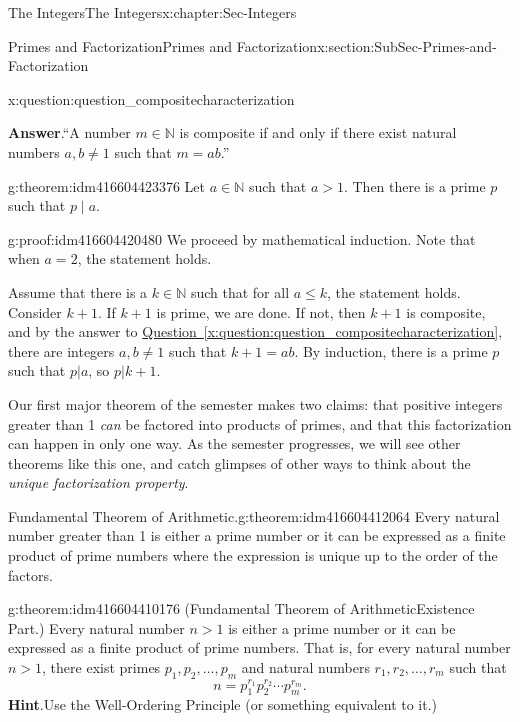 \documentclass[oneside,10pt,]{book}
\numberwithin{equation}{section}
\renewcommand{\le}{\leqslant}
\def\N{{\mathbb N}}
\begin{document}
\begin{chapterptx}{The Integers}{}{The Integers}{}{}{x:chapter:Sec-Integers}
\begin{sectionptx}{Primes and Factorization}{}{Primes and Factorization}{}{}{x:section:SubSec-Primes-and-Factorization}
\begin{question}{}{x:question:question_compositecharacterization}
\par\smallskip%
\noindent\textbf{Answer}.\hypertarget{g:answer:idm416604426080}{}\quad{}``A number \(m\in\N\) is composite if and only if there exist natural numbers \(a,b\ne 1\) such that \(m = ab\).''%
\end{question}
\begin{theorem}{}{}{g:theorem:idm416604423376}%
Let \(a\in \N\) such that \(a > 1\). Then there is a prime \(p\) such that \(p\mid a\).%
\end{theorem}
\begin{proofptx}{}{g:proof:idm416604420480}
We proceed by mathematical induction. Note that when \(a = 2\), the statement holds.%
\par
Assume that there is a \(k\in\N\) such that for all \(a\le k\), the statement holds. Consider \(k+1\). If \(k+1\) is prime, we are done. If not, then \(k+1\) is composite, and by the answer to \hyperref[x:question:question_compositecharacterization]{Question~\ref{x:question:question_compositecharacterization}}, there are integers \(a,b\ne 1\) such that \(k+1 = ab\). By induction, there is a prime \(p\) such that \(p|a\), so \(p|k+1\).%
\end{proofptx}
Our first major theorem of the semester makes two claims: that positive integers greater than 1 \emph{can} be factored into products of primes, and that this factorization can happen in only one way. As the semester progresses, we will see other theorems like this one, and catch glimpses of other ways to think about the \emph{unique factorization property}.%
\begin{theorem}{Fundamental Theorem of Arithmetic.}{}{g:theorem:idm416604412064}%
Every natural number greater than 1 is either a prime number or it can be expressed as a finite product of prime numbers where the expression is unique up to the order of the factors.%
\end{theorem}
\begin{theorem}{}{}{g:theorem:idm416604410176}%
(Fundamental Theorem of Arithmetic\textendash{}Existence Part.)\footnotemark{} Every natural number \(n > 1\) is either a prime number or it can be expressed as a finite product of prime numbers. That is, for every natural number \(n > 1\), there exist primes \(p_1, p_2, \ldots,
p_m\) and natural numbers \(r_1, r_2, \ldots, r_m\) such that%
\begin{equation*}
n = p_1^{r_1} p_2^{r_2} \cdots p_m^{r_m}\text{.}
\end{equation*}
%
\textbf{Hint}.\quad{}Use the Well-Ordering Principle (or something equivalent to it.)%

\end{theorem}
\end{sectionptx}
\end{chapterptx}
\end{document}
